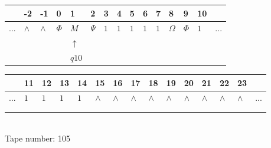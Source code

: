 \documentclass[11pt]{article}
\begin{document}
\begin{table}[H]
\centering
\begin{tabular}{lllllllllllllll}
 & -2 & -1 & 0 & 1 & 2 & 3 & 4 & 5 & 6 & 7 & 8 & 9 & 10 & \\
\hline
$...$ & \multicolumn{1}{|l|}{$\wedge$} & \multicolumn{1}{|l|}{$\wedge$} & \multicolumn{1}{|l|}{$\Phi$} & \multicolumn{1}{|l|}{$M$} & \multicolumn{1}{|l|}{$\Psi$} & \multicolumn{1}{|l|}{$1$} & \multicolumn{1}{|l|}{$1$} & \multicolumn{1}{|l|}{$1$} & \multicolumn{1}{|l|}{$1$} & \multicolumn{1}{|l|}{$1$} & \multicolumn{1}{|l|}{$\Omega$} & \multicolumn{1}{|l|}{$\Phi$} & \multicolumn{1}{|l|}{$1$} & $...$\\
\hline
&  &  &  & $\uparrow$ &  &  &  &  &  &  &  &  &  &  \\
&  &  &  & $ q10 $ &  &  &  &  &  &  &  &  &  &  \\
\end{tabular}
\begin{tabular}{lllllllllllllll}
 & 11 & 12 & 13 & 14 & 15 & 16 & 17 & 18 & 19 & 20 & 21 & 22 & 23 & \\
\hline
$...$ & \multicolumn{1}{|l|}{$1$} & \multicolumn{1}{|l|}{$1$} & \multicolumn{1}{|l|}{$1$} & \multicolumn{1}{|l|}{$1$} & \multicolumn{1}{|l|}{$\wedge$} & \multicolumn{1}{|l|}{$\wedge$} & \multicolumn{1}{|l|}{$\wedge$} & \multicolumn{1}{|l|}{$\wedge$} & \multicolumn{1}{|l|}{$\wedge$} & \multicolumn{1}{|l|}{$\wedge$} & \multicolumn{1}{|l|}{$\wedge$} & \multicolumn{1}{|l|}{$\wedge$} & \multicolumn{1}{|l|}{$\wedge$} & $...$\\
\hline
&  &  &  &  &  &  &  &  &  &  &  &  &  &  \\
&  &  &  &  &  &  &  &  &  &  &  &  &  &  \\
\end{tabular}
\\
Tape number: 105
\noindent\makebox[\linewidth]{\hdashrule{\textwidth}{1pt}{1pt}}\end{table}
\end{document}
